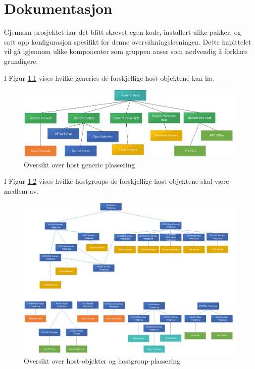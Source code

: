 \chapter{Dokumentasjon}
Gjennom prosjektet har det blitt skrevet egen kode, installert ulike pakker, og satt opp konfigurasjon spesifikt for denne overvåkningsløsningen. Dette kapittelet vil gå igjennom ulike komponenter som gruppen anser som nødvendig å forklare grundigere.
\clearpage

I Figur \ref{hostfigur} vises hvilke generics de forskjellige host-objektene kan ha.

	\begin{figure}[H]
	    \centering
	    \includegraphics[scale=0.5]{img/host}
	    \caption{Oversikt over host generic plassering}
	    \label{hostfigur}
	\end{figure}

I Figur \ref{hostgroupfigur} vises hvilke hostgroups de forskjellige host-objektene skal være medlem av.
\begin{figure}[H]
    \centering
    \includegraphics[scale=0.5]{img/hostgroups}
    \caption{Oversikt over host-objekter og hostgroup-plassering}
    \label{hostgroupfigur}
\end{figure}


